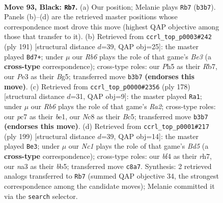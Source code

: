 \documentclass[11pt]{article}
\begin{document}
\clearpage

\begin{figure}[p]\centering
\begin{subfigure}{0.46\textwidth}\centering
\resizebox{\linewidth}{!}{%
\newchessgame
\chessboard[
  setfen={2n1k1K1/2P5/p7/P4p1p/5B2/Nr2p1Pb/8/R7 b - - 5 93},
  showmover=false,
  pgfstyle=straightmove, color=movearrow, markmove={b3-b7}
]}
\caption{}
\end{subfigure}\hfill
\begin{subfigure}{0.46\textwidth}\centering
\resizebox{\linewidth}{!}{%
\newchessgame
\chessboard[
  setfen={7k/1r6/4b3/2pNP1b1/K1P4p/2P5/2B5/6R1 b - - 2 96},
  showmover=false,
  pgfstyle=straightmove, color=movearrow, markmove={e6-d7}
]}
\caption{}
\end{subfigure}
\\[4pt]
\begin{subfigure}{0.46\textwidth}\centering
\resizebox{\linewidth}{!}{%
\newchessgame
\chessboard[
  setfen={8/1p3p2/2b1p3/p1B1P2k/P4P2/7K/R7/4b3 w - - 2 90},
  showmover=false,
  pgfstyle=straightmove, color=movearrow, markmove={a2-a1}
]}
\caption{}
\end{subfigure}\hfill
\begin{subfigure}{0.46\textwidth}\centering
\resizebox{\linewidth}{!}{%
\newchessgame
\chessboard[
  setfen={8/7R/1p2k2p/1B3p1P/P2b4/6P1/1r6/5K2 b - - 1 100},
  showmover=false,
  pgfstyle=straightmove, color=movearrow, markmove={d4-e3}
]}
\caption{}
\end{subfigure}
\caption{\textbf{Move 93, Black: \texttt{Rb7}.} (a) Our position; Melanie plays \texttt{Rb7} (\texttt{b3b7}). Panels (b)--(d) are the retrieved master positions whose correspondence most drove this move (highest QAP objective among those that transfer to it). (b) Retrieved from \texttt{ccrl\_top\_p0003\#242} (ply 191) [structural distance $d$=39, QAP obj=25]: the master played \texttt{Bd7+}; under $\mu$ our \emph{Rb6} plays the role of that game's \emph{Be3} (a \textbf{cross-type} correspondence); cross-type roles: our \emph{P}h5 as their \emph{R}b7, our \emph{P}e3 as their \emph{B}g5; transferred move \texttt{b3b7} \textbf{(endorses this move)}. (c) Retrieved from \texttt{ccrl\_top\_p0000\#2356} (ply 178) [structural distance $d$=31, QAP obj=9]: the master played \texttt{Ra1}; under $\mu$ our \emph{Rb6} plays the role of that game's \emph{Ra2}; cross-type roles: our \emph{p}c7 as their \emph{b}e1, our \emph{N}c8 as their \emph{B}c5; transferred move \texttt{b3b7} \textbf{(endorses this move)}. (d) Retrieved from \texttt{ccrl\_top\_p0001\#217} (ply 199) [structural distance $d$=39, QAP obj=14]: the master played \texttt{Be3}; under $\mu$ our \emph{Nc1} plays the role of that game's \emph{Bd5} (a \textbf{cross-type} correspondence); cross-type roles: our \emph{b}f4 as their \emph{r}h7, our \emph{n}a3 as their \emph{b}b5; transferred move \texttt{c8a7}. Synthesis: 2 retrieved analogs transferred to \texttt{Rb7} (summed QAP objective 34, the strongest correspondence among the candidate moves); Melanie committed it via the \texttt{search} selector.}
\label{fig:thought-m185}
\end{figure}
\end{document}
